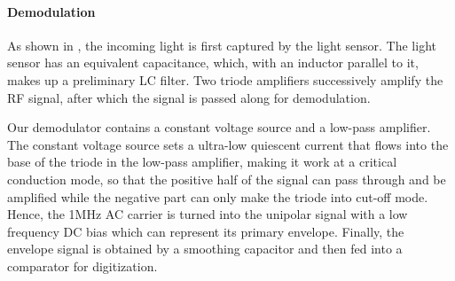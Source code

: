 \paragraph{Demodulation}
As shown in , the incoming light is first captured by the light sensor. 
The light sensor has an equivalent capacitance, which, with an inductor parallel to it, makes up a preliminary LC filter. Two triode amplifiers successively amplify the RF signal, after which the signal is passed along for demodulation. 

Our demodulator contains a constant voltage source and a low-pass amplifier. The constant voltage source sets a ultra-low quiescent current that flows into the base of the triode in the low-pass amplifier, making it work at a critical conduction mode, so that the positive half of the signal can pass through and be amplified while the negative part can only make the triode into cut-off mode. Hence, the 1MHz AC carrier is turned into the unipolar signal with a low frequency DC bias which can represent its primary envelope. Finally, the envelope signal is obtained by a smoothing capacitor and then fed into a comparator for digitization. 


